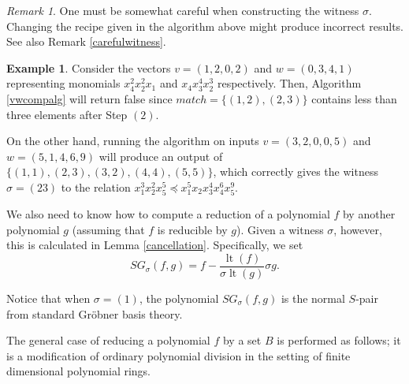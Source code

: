 \documentclass{amsart}
\theoremstyle{definition}
\newtheorem{example}[theorem]{Example}
\theoremstyle{remark}
\newtheorem{remark}[theorem]{Remark}
\numberwithin{equation}{section}
\newcommand{\lt}{\operatorname{lt}}
\newcommand{\<}{\langle}
\renewcommand{\>}{\rangle}
\begin{document}
\begin{remark}
One must be somewhat careful when constructing the witness $\sigma$.  Changing the recipe
given in the algorithm above might produce incorrect results.  See also Remark \ref{carefulwitness}.
\end{remark}


\begin{example}
Consider the vectors $v = (1,2,0,2)$ and $w = (0,3,4,1)$ representing monomials
$x_4^2 x_2^2 x_1$ and $x_4 x_3^4 x_2^3$ respectively.  
Then, Algorithm \ref{vwcompalg} will return false since $match = \{(1,2),(2,3)\}$ 
contains less than three elements after Step $(2)$.

On the other hand, running the algorithm on inputs $v = (3,2,0,0,5)$ and
$w = (5,1,4,6,9)$ will produce an output of $\{(1,1),(2,3),(3,2),(4,4),(5,5)\}$, which
correctly gives the witness $\sigma = (23)$ to the relation 
$x_1^3 x_2^2 x_5^5 \preceq x_1^5 x_2x_3^4 x_4^6 x_5^9$.
\end{example}

We also need to know how to compute a reduction of a polynomial $f$ by another 
polynomial $g$ (assuming that $f$ is reducible by $g$).  Given a witness $\sigma$, however,
this is calculated in Lemma \ref{cancellation}.  Specifically, we set
\begin{equation}\label{sgpoly}
SG_{\sigma}(f,g) = f - \frac{\lt(f)}{\sigma \lt(g)} \sigma g.
\end{equation}

Notice that when $\sigma = (1)$, the polynomial $SG_{\sigma}(f,g)$ is 
the normal $S$-pair from standard Gr\"obner basis theory.

The general case of reducing
a polynomial $f$ by a set $B$ is performed as follows; it is a modification of
ordinary polynomial division in the setting of finite dimensional polynomial rings.
\end{document}
